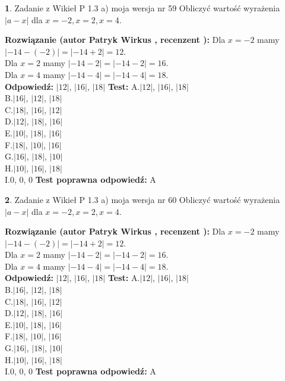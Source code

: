 \documentclass[12pt, a4paper]{article}
\theoremstyle{definition} %
\newtheorem{zad}{}
\newcommand{\zadStart}[1]{\begin{zad}#1\newline}
\newcommand{\zadStop}{\end{zad}}
\newcommand{\rozwStart}[2]{\noindent \textbf{Rozwiązanie (autor #1 , recenzent #2): }\newline}
\newcommand{\rozwStop}{\newline}
\newcommand{\odpStart}{\noindent \textbf{Odpowiedź:}\newline}
\newcommand{\odpStop}{\newline}
\newcommand{\testStart}{\noindent \textbf{Test:}\newline}
\newcommand{\testStop}{\newline}
\newcommand{\kluczStart}{\noindent \textbf{Test poprawna odpowiedź:}\newline}
\newcommand{\kluczStop}{\newline}
\begin{document}
\zadStart{Zadanie z Wikieł P 1.3 a) moja wersja nr 59}
Obliczyć wartość wyrażenia $|a - x|$ dla $x=-2,x=2,x=4$.
\zadStop
\rozwStart{Patryk Wirkus}{}
Dla $x = -2$ mamy $|-14 - (-2)| = |-14 + 2| = 12$.\\
Dla $x = 2$ mamy $|-14 - 2| = |-14 - 2| = 16$.\\
Dla $x = 4$ mamy $|-14 - 4| = |-14 - 4| = 18$.\\
\rozwStop
\odpStart
$|12|$, $|16|$, $|18|$
\odpStop
\testStart
A.$|12|$, $|16|$, $|18|$\\
B.$|16|$, $|12|$, $|18|$\\
C.$|18|$, $|16|$, $|12|$\\
D.$|12|$, $|18|$, $|16|$\\
E.$|10|$, $|18|$, $|16|$\\
F.$|18|$, $|10|$, $|16|$\\
G.$|16|$, $|18|$, $|10|$\\
H.$|10|$, $|16|$, $|18|$\\
I.$0$, $0$, $0$
\testStop
\kluczStart
A
\kluczStop



\zadStart{Zadanie z Wikieł P 1.3 a) moja wersja nr 60}
Obliczyć wartość wyrażenia $|a - x|$ dla $x=-2,x=2,x=4$.
\zadStop
\rozwStart{Patryk Wirkus}{}
Dla $x = -2$ mamy $|-14 - (-2)| = |-14 + 2| = 12$.\\
Dla $x = 2$ mamy $|-14 - 2| = |-14 - 2| = 16$.\\
Dla $x = 4$ mamy $|-14 - 4| = |-14 - 4| = 18$.\\
\rozwStop
\odpStart
$|12|$, $|16|$, $|18|$
\odpStop
\testStart
A.$|12|$, $|16|$, $|18|$\\
B.$|16|$, $|12|$, $|18|$\\
C.$|18|$, $|16|$, $|12|$\\
D.$|12|$, $|18|$, $|16|$\\
E.$|10|$, $|18|$, $|16|$\\
F.$|18|$, $|10|$, $|16|$\\
G.$|16|$, $|18|$, $|10|$\\
H.$|10|$, $|16|$, $|18|$\\
I.$0$, $0$, $0$
\testStop
\kluczStart
A
\kluczStop
\end{document}
